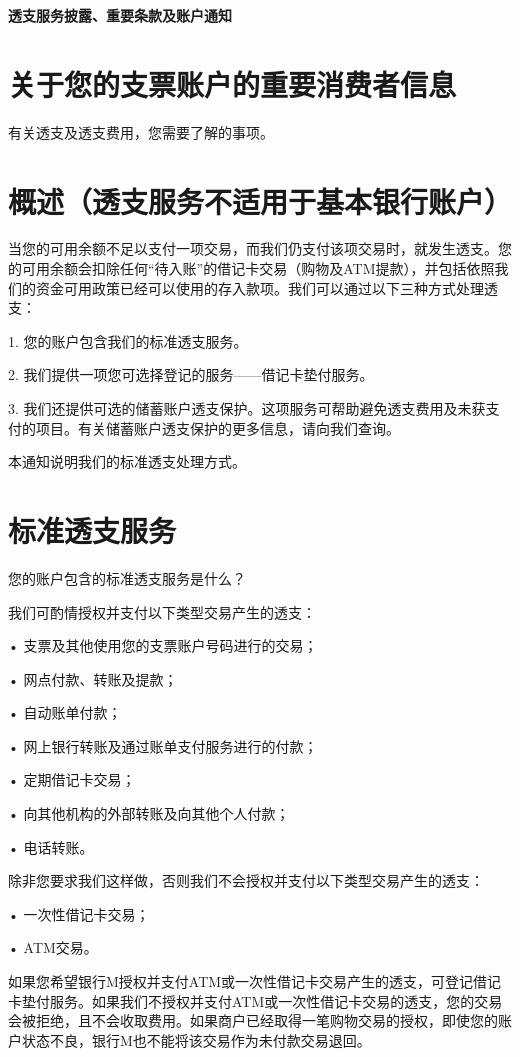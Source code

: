 \documentclass[UTF8,fontset=none,11pt,a4paper]{ctexart}
\begin{document}
{\noindent\LARGE\bfseries 透支服务披露、重要条款及账户通知\par}
\vspace{10pt}
\section*{关于您的支票账户的重要消费者信息}
有关透支及透支费用，您需要了解的事项。


\section*{概述（透支服务不适用于基本银行账户）}
当您的可用余额不足以支付一项交易，而我们仍支付该项交易时，就发生透支。您的可用余额会扣除任何“待入账”的借记卡交易（购物及ATM提款），并包括依照我们的资金可用政策已经可以使用的存入款项。我们可以通过以下三种方式处理透支：


1. 您的账户包含我们的标准透支服务。


2. 我们提供一项您可选择登记的服务——借记卡垫付服务。


3. 我们还提供可选的储蓄账户透支保护。这项服务可帮助避免透支费用及未获支付的项目。有关储蓄账户透支保护的更多信息，请向我们查询。


本通知说明我们的标准透支处理方式。


\section*{标准透支服务}
您的账户包含的标准透支服务是什么？


我们可酌情授权并支付以下类型交易产生的透支：


• 支票及其他使用您的支票账户号码进行的交易；


• 网点付款、转账及提款；


• 自动账单付款；


• 网上银行转账及通过账单支付服务进行的付款；


• 定期借记卡交易；


• 向其他机构的外部转账及向其他个人付款；


• 电话转账。


除非您要求我们这样做，否则我们不会授权并支付以下类型交易产生的透支：


• 一次性借记卡交易；


• ATM交易。


如果您希望银行M授权并支付ATM或一次性借记卡交易产生的透支，可登记借记卡垫付服务。如果我们不授权并支付ATM或一次性借记卡交易的透支，您的交易会被拒绝，且不会收取费用。如果商户已经取得一笔购物交易的授权，即使您的账户状态不良，银行M也不能将该交易作为未付款交易退回。
\end{document}
